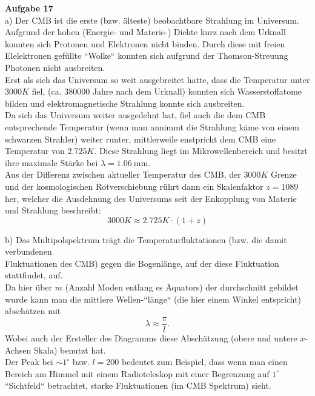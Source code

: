 \documentclass[11pt, a4paper]{article}
\begin{document}
\thispagestyle{fancy}
\noindent
{\large\textbf{Aufgabe 17}} \\[0.2cm]

a) Der CMB ist die erste (bzw. älteste) beobachtbare Strahlung im Universum. \\
Aufgrund der hohen (Energie- und Materie-) Dichte kurz nach dem Urknall konnten sich Protonen und 
Elektronen nicht binden. Durch diese mit freien Elelektronen gefüllte ``Wolke`` konnten sich aufgrund 
der Thomson-Streuung Photonen nicht ausbreiten.\\
Erst als sich das Universum so weit ausgebreitet hatte, dass die Temperatur unter $3000K$ fiel, 
(ca. {380000} Jahre nach dem Urknall) konnten sich 
Wasserstoffatome bilden und elektromagnetische Strahlung konnte sich ausbreiten.\\
Da sich das Universum weiter ausgedehnt hat, fiel auch die dem CMB entsprechende Temperatur (wenn man annimmt 
die Strahlung käme von einem schwarzen Strahler) weiter runter, mittlerweile enstpricht dem CMB eine Temperatur von
$2.725K$. 
Diese Strahlung liegt im Mikrowellenbereich und besitzt ihre maximale Stärke bei $\lambda = 1.06\ \text{mm}$.
\\
Aus der Differenz zwischen aktueller Temperatur des CMB, der $3000K$ Grenze und der kosmologischen Rotverschiebung
rührt dann ein Skalenfaktor $z=1089$ her, welcher die Ausdehnung des Universums seit der Enkopplung von Materie und 
Strahlung beschreibt:
\[ 3000K \approx 2.725K \cdot (1 + z) \]

b) Das Multipolspektrum trägt die Temperaturfluktationen (bzw. die damit verbundenen \\ Fluktuationen des CMB) 
gegen die Bogenlänge, auf der diese Fluktuation stattfindet, auf. \\
Da hier über $m$ (Anzahl Moden entlang es Äquators) der durchschnitt gebildet wurde kann man die mittlere 
Wellen-``länge`` (die hier einem Winkel entspricht) abschätzen mit
\[ \lambda \approx \frac{\pi}{l}. \]
Wobei auch der Ersteller des Diagramms diese Abschätzung (obere und untere $x$-Achsen Skala) benutzt hat. \\
Der Peak bei $\sim 1^\circ$ bzw. $l = 200$ bedeutet zum Beispiel, dass wenn man einen Bereich am Himmel
mit einem Radioteleskop mit einer  Begrenzung auf $1^\circ$ ``Sichtfeld``
betrachtet, starke Fluktuationen (im CMB Spektrum) sieht.
\end{document}
